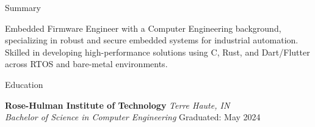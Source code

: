 \documentclass[
	11pt, %
]{resume} %
\begin{document}

\begin{rSection}{Summary}

Embedded Firmware Engineer with a Computer Engineering background, 
specializing in robust and secure embedded systems for industrial automation. 
Skilled in developing high-performance solutions using C, Rust, and Dart/Flutter across RTOS and bare-metal environments.

\end{rSection}


\begin{rSection}{Education}
	
	\textbf{Rose-Hulman Institute of Technology} \hfill \textit{Terre Haute, IN} \\ 
	\textit{Bachelor of Science in Computer Engineering} \hfill Graduated: May 2024
	
\end{rSection}

\end{document}
